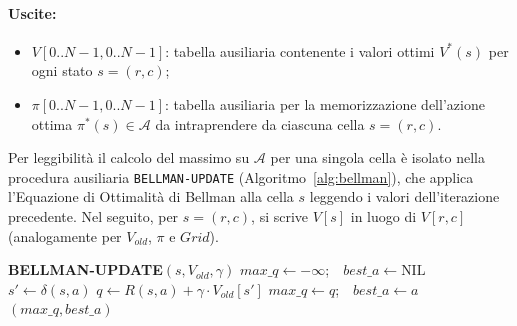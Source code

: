 \paragraph{Uscite:}
\begin{itemize}
    \item $V[0..N-1, 0..N-1]$: tabella ausiliaria contenente i valori ottimi $V^*(s)$ per ogni stato $s = (r,c)$;
    \item $\pi[0..N-1, 0..N-1]$: tabella ausiliaria per la memorizzazione dell'azione ottima $\pi^*(s) \in \mathcal{A}$ da intraprendere da ciascuna cella $s = (r,c)$.
\end{itemize}

\noindent
Per leggibilità il calcolo del massimo su $\mathcal{A}$ per una singola cella è isolato nella procedura ausiliaria \texttt{BELLMAN-UPDATE} (Algoritmo~\ref{alg:bellman}), che applica l'Equazione di Ottimalità di Bellman alla cella $s$ leggendo i valori dell'iterazione precedente. Nel seguito, per $s = (r,c)$, si scrive $V[s]$ in luogo di $V[r,c]$ (analogamente per $V_{old}$, $\pi$ e $Grid$).

\begin{algorithm}[H]
\caption{Aggiornamento di Bellman per una singola cella}
\label{alg:bellman}
\begin{algorithmic}[1]
\Statex \textbf{BELLMAN-UPDATE}$(s, V_{old}, \gamma)$
\State $max\_q \gets -\infty$;\ \ $best\_a \gets \text{NIL}$
 \label{bu:for}
    \State \Do $s' \gets \delta(s, a)$
    \State $q \gets R(s, a) + \gamma \cdot V_{old}[s']$
        \State \Then $max\_q \gets q$;\ \ $best\_a \gets a$ \label{bu:endfor}
    \EndIf
\EndFor
\State \Return $(max\_q, best\_a)$
\end{algorithmic}
\end{algorithm}

